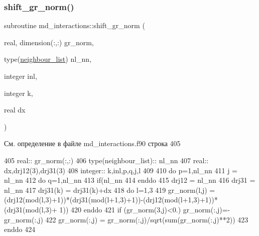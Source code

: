 \subsubsection{\texorpdfstring{shift\+\_\+gr\+\_\+norm()}{shift\_gr\_norm()}}
{\footnotesize\ttfamily subroutine md\+\_\+interactions\+::shift\+\_\+gr\+\_\+norm (\begin{DoxyParamCaption}\item[{real, dimension(\+:,\+:)}]{gr\+\_\+norm,  }\item[{type(\mbox{\hyperlink{structmd__general_1_1neighbour__list}{neighbour\+\_\+list}})}]{nl\+\_\+nn,  }\item[{integer}]{inl,  }\item[{integer}]{k,  }\item[{real}]{dx }\end{DoxyParamCaption})}



См. определение в файле md\+\_\+interactions.\+f90 строка 405


\begin{DoxyCode}
405     \textcolor{keywordtype}{real}:: gr\_norm(:,:)
406     \textcolor{keywordtype}{type}(neighbour\_list):: nl\_nn
407     \textcolor{keywordtype}{real}:: dx,drj12(3),drj31(3)
408     \textcolor{keywordtype}{integer}:: k,inl,p,q,j,l
409     
410     \textcolor{keywordflow}{do} p=1,nl\_nn%
411         j = nl\_nn%
412         \textcolor{keywordflow}{do} q=1,nl\_nn%
413             \textcolor{keywordflow}{if}(nl\_nn%
414 \textcolor{keywordflow}{        enddo}   
415         drj12 = nl\_nn%
416         drj31 = nl\_nn%
417         drj31(k) = drj31(k)+dx
418         \textcolor{keywordflow}{do} l=1,3
419             gr\_norm(l,j) = (drj12(mod(l,3)+1))*(drj31(mod(l+1,3)+1))-(drj12(mod(l+1,3)+1))*(drj31(mod(l,3)+
      1))
420 \textcolor{keywordflow}{        enddo}
421         \textcolor{keywordflow}{if} (gr\_norm(3,j)<0.) gr\_norm(:,j)=-gr\_norm(:,j)
422         gr\_norm(:,j) = gr\_norm(:,j)/sqrt(sum(gr\_norm(:,j)**2))
423 \textcolor{keywordflow}{    enddo}
424     
\end{DoxyCode}
\mbox{\label{namespacemd__interactions_a311e6b53338f1b89611eec1929a6387e}} 
